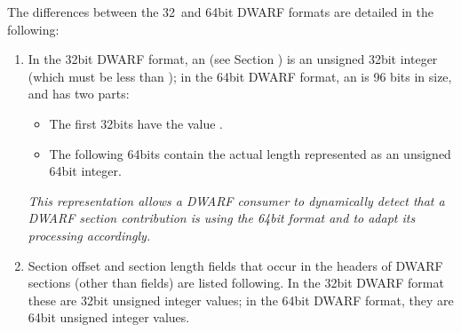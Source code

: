 The differences between the 32\dash\   and 64\dash bit 
DWARF formats are
detailed in the following:
\begin{enumerate}[1. ]

\item  In the 32\dash bit DWARF format, an 
(see 
Section ) 
is an unsigned 32\dash bit integer (which
must be less than \xfffffffzero); in the 64\dash bit DWARF format,
an  is 96 bits in size,
and has two parts:
\begin{itemize}
\item The first 32\dash bits have the value \xffffffff.

\item  The following 64\dash bits contain the actual length
represented as an unsigned 64\dash bit integer.
\end{itemize}

\textit{This representation allows a DWARF consumer to dynamically
detect that a DWARF section contribution is using the 64\dash bit
format and to adapt its processing accordingly.}

\item Section offset and section length 
fields that occur
in the headers of DWARF sections (other 
than 
fields) are listed following. In the 32\dash bit DWARF format these
are 32\dash bit unsigned integer values; in the 64\dash bit DWARF format,
they 
are 
64\dash bit 
unsigned integer values.


\end{enumerate}
